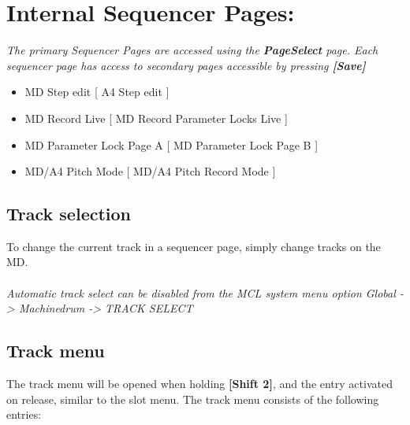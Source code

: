 \chapter{Internal Sequencer Pages:}

\textit{The primary Sequencer Pages are accessed using the \textbf{PageSelect} page. Each sequencer page has access to secondary pages accessible by pressing \textbf{[Save]}}
\begin{itemize}
	\item MD Step edit                          [ A4 Step edit ]
	\item MD Record Live                      [ MD Record Parameter Locks Live ]
	\item MD Parameter Lock Page A  [ MD Parameter Lock Page B ]
	\item MD/A4 Pitch Mode                [ MD/A4 Pitch Record Mode ]
\end{itemize}
\section{Track selection}
To change the current track in a sequencer page, simply change tracks on the MD. 
\\\\
\textit{Automatic track select can be disabled from the MCL system menu option Global -> Machinedrum -> TRACK SELECT}
\section{Track menu}

\vspace{-10pt}


The track menu will be opened when holding \textbf{[Shift 2]}, and the entry activated on release, similar to the slot menu.
The track menu consists of the following entries:

